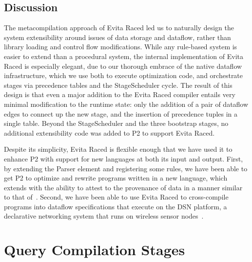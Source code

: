 \subsection{Discussion}
The metacompilation approach of Evita Raced led us to naturally design the system extensibility around issues of data storage and dataflow, rather than library loading and control flow modifications.  While any rule-based system is easier to extend than a procedural system, the internal implementation of Evita Raced is especially elegant, due to our thorough embrace of the native dataflow infrastructure, which we use both to execute optimization code, and orchestrate stages via precedence tables and the StageScheduler cycle.  The result of this design is that
even a major addition to the Evita Raced compiler entails very minimal
modification to the runtime state: only the addition of a pair of
dataflow edges to connect up the new stage, and the insertion of
precedence tuples in a single table.  Beyond the StageScheduler and the three bootstrap stages, no additional extensibility code was added to P2 to support Evita Raced.

Despite its simplicity, Evita Raced is flexible enough that we have used it to enhance P2 with support for new languages at both its input and output.  First, by extending the Parser element and registering some \OVERLOG rules, we have been able to get P2  to optimize and rewrite programs written in a new language, which extends \OVERLOG with the ability to attest to the provenance of data in a manner similar to that of~\cite{abadi-netdb07}.  Second, we have been able to use Evita Raced to cross-compile \OVERLOG programs into dataflow specifications that execute on the DSN platform, a declarative networking system that runs on wireless sensor nodes~\cite{chu-sensys07}.


\section{Query Compilation Stages}
\label{ch:evita:sec:stages}

